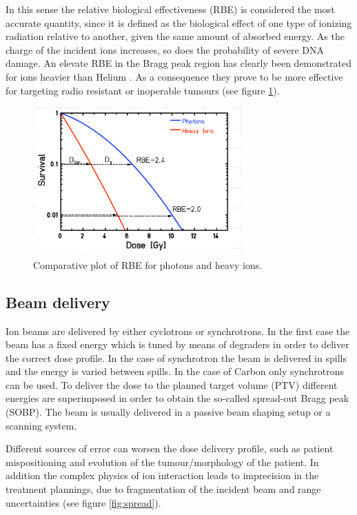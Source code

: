 In this sense the relative biological effectiveness (RBE) is considered the most accurate quantity, since it is defined as the biological effect of one type of ionizing radiation relative to another, given the same amount of absorbed energy. As the charge of the incident ions increases, so does the probability of severe DNA damage. An elevate RBE in the Bragg peak region has clearly been demonstrated for ions heavier than Helium  \cite{Linz2011}.
As a consequence they prove to be more effective for targeting radio resistant or inoperable tumours (see figure \ref{fig:rbe}).

\begin{figure}  
\centering
\includegraphics[width=8cm]{Pictures/Chapter_1/rbe.pdf}
\caption[RBE comparison]{Comparative plot of RBE for photons and heavy ions.}
\label{fig:rbe}
\end{figure}

\subsection{Beam delivery}

Ion beams are delivered by either cyclotrons or synchrotrons. In the first case the beam has a fixed energy which is tuned by means of degraders in order to deliver the correct dose profile. In the case of synchrotron the beam is delivered in spills and the energy is varied between spills. In the case of Carbon only synchrotrons can be used.
To deliver the dose to the planned target volume (PTV) different energies are superimposed in order to obtain the so-called spread-out Bragg peak (SOBP). The beam is usually delivered in a passive beam shaping setup or a scanning system. 

Different sources of error can worsen the dose delivery profile, such as patient mispositioning and evolution of the tumour/morphology of the patient. In addition the complex physics of ion interaction leads to imprecision in the treatment plannings, due to fragmentation of the incident beam and range uncertainties (see figure \ref{fig:spread}).

